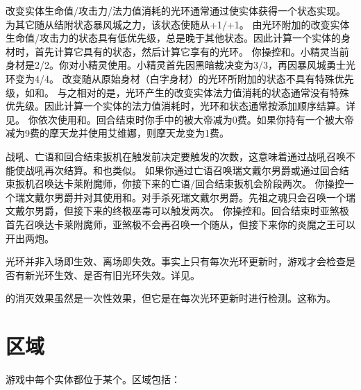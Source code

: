 改变实体生命值/攻击力/法力值消耗的光环通常通过使实体获得一个状态实现。
\example {}为其它随从结附状态暴风城之力，该状态使随从+1/+1。
\notice 由光环附加的改变实体生命值/攻击力的状态具有低优先级，总是晚于其他状态。因此计算一个实体的身材时，首先计算它具有的状态，然后计算它享有的光环。
\example 你操控和。小精灵当前身材是2/2。你对小精灵使用。小精灵首先因黑暗裁决变为3/3，再因暴风城勇士光环变为4/4。
\exception 改变随从原始身材（白字身材）的光环所附加的状态不具有特殊优先级，如和。
\notice 与之相对的是，光环产生的改变实体法力值消耗的状态通常没有特殊优先级。因此计算一个实体的法力值消耗时，光环和状态通常按添加顺序结算。详见。
\example 你依次使用和。回合结束时你手中的被大帝减为0费。如果你持有一个被大帝减为9费的摩天龙并使用艾维娜，则摩天龙变为1费。

战吼、亡语和回合结束扳机在触发前决定要触发的次数，这意味着通过战吼召唤不能使战吼再次结算。和也类似。
\notice 如果你通过亡语召唤瑞文戴尔男爵或通过回合结束扳机召唤达卡莱附魔师，你接下来的亡语/回合结束扳机会阶段两次。
\example 你操控一个瑞文戴尔男爵并对其使用和。对手杀死瑞文戴尔男爵。先祖之魂只会召唤一个瑞文戴尔男爵，但接下来的终极巫毒可以触发两次。
\example 你操控和。回合结束时亚煞极首先召唤达卡莱附魔师，亚煞极不会再召唤一个随从，但接下来你的炎魔之王可以开出两炮。

光环并非入场即生效、离场即失效。事实上只有每次光环更新时，游戏才会检查是否有新光环生效、是否有旧光环失效。详见。

的消灭效果虽然是一次性效果，但它是在每次光环更新时进行检测。这称为。

\section{区域}
\label{zone}

游戏中每个实体都位于某个。区域包括：

